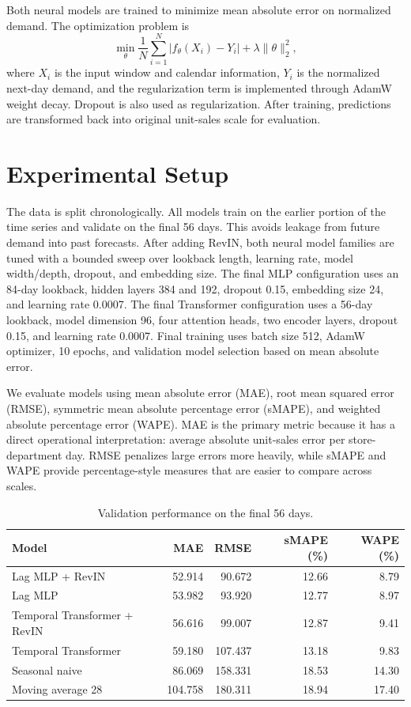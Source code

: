 \documentclass[11pt]{article}
\begin{document}
Both neural models are trained to minimize mean absolute error on normalized demand. The optimization problem is
\begin{equation}
    \min_{\theta} \frac{1}{N}\sum_{i=1}^{N} \left|f_{\theta}(X_i)-Y_i\right| + \lambda\|\theta\|_2^2,
\end{equation}
where $X_i$ is the input window and calendar information, $Y_i$ is the normalized next-day demand, and the regularization term is implemented through AdamW weight decay. Dropout is also used as regularization. After training, predictions are transformed back into original unit-sales scale for evaluation.

\section{Experimental Setup}

The data is split chronologically. All models train on the earlier portion of the time series and validate on the final 56 days. This avoids leakage from future demand into past forecasts. After adding RevIN, both neural model families are tuned with a bounded sweep over lookback length, learning rate, model width/depth, dropout, and embedding size. The final MLP configuration uses an 84-day lookback, hidden layers 384 and 192, dropout 0.15, embedding size 24, and learning rate 0.0007. The final Transformer configuration uses a 56-day lookback, model dimension 96, four attention heads, two encoder layers, dropout 0.15, and learning rate 0.0007. Final training uses batch size 512, AdamW optimizer, 10 epochs, and validation model selection based on mean absolute error.

We evaluate models using mean absolute error (MAE), root mean squared error (RMSE), symmetric mean absolute percentage error (sMAPE), and weighted absolute percentage error (WAPE). MAE is the primary metric because it has a direct operational interpretation: average absolute unit-sales error per store-department day. RMSE penalizes large errors more heavily, while sMAPE and WAPE provide percentage-style measures that are easier to compare across scales.

\begin{table}[H]
\centering
\caption{Validation performance on the final 56 days.}
\label{tab:metrics}
\begin{tabular}{lrrrr}
\toprule
Model & MAE & RMSE & sMAPE (\%) & WAPE (\%) \\
\midrule
Lag MLP + RevIN & 52.914 & 90.672 & 12.66 & 8.79 \\
Lag MLP & 53.982 & 93.920 & 12.77 & 8.97 \\
Temporal Transformer + RevIN & 56.616 & 99.007 & 12.87 & 9.41 \\
Temporal Transformer & 59.180 & 107.437 & 13.18 & 9.83 \\
Seasonal naive & 86.069 & 158.331 & 18.53 & 14.30 \\
Moving average 28 & 104.758 & 180.311 & 18.94 & 17.40 \\
\bottomrule
\end{tabular}
\end{table}
\end{document}
